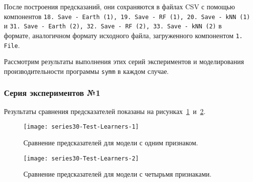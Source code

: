 После построения предсказаний, они сохраняются в файлах CSV с помощью компонентов \texttt{18. Save - Earth (1), 19. Save - RF (1), 20. Save - kNN (1)} и \texttt{31. Save - Earth (2), 32. Save - RF (2), 33. Save - kNN (2)} в формате, аналогичном формату исходного файла, загруженного компонентом \texttt{1. File}.

Рассмотрим результаты выполнения этих серий экспериментов и моделирования производительности программы \texttt{symm} в каждом случае.

\subsubsection{Серия экспериментов №1}

Результаты сравнения предсказателей показаны на рисунках~\ref{img:series30-Test-Learners-1}~и~\ref{img:series30-Test-Learners-2}.

\begin{figure}[H]
    \begin{center}
            \texttt{[image: series30-Test-Learners-1]}
            \caption{Сравнение предсказателей для модели с одним признаком.} %
            \label{img:series30-Test-Learners-1} %
    \end{center}
\end{figure}

\begin{figure}[H]
    \begin{center}
            \texttt{[image: series30-Test-Learners-2]}
            \caption{Сравнение предсказателей для модели с четырьмя признаками.}
            \label{img:series30-Test-Learners-2}
    \end{center}
\end{figure}